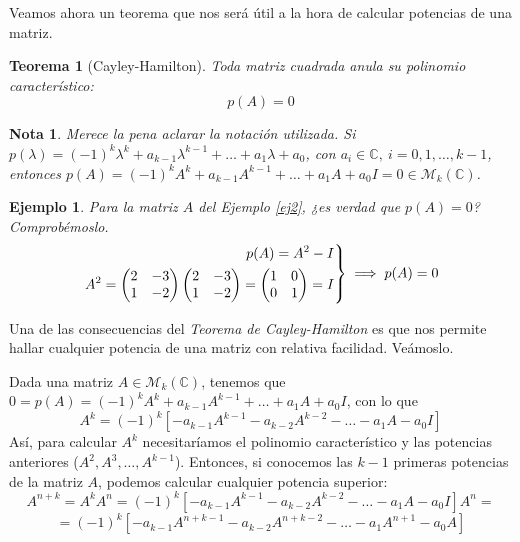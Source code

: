 \documentclass[11pt, a4paper]{article}
\newif\IfInSansMode
\numberwithin{equation}{section}
\newcommand{\pl}{p(\lambda)}
\theoremstyle{theorem-style}
\newtheorem{nth}{Teorema}[section]
\theoremstyle{definition-style}
\theoremstyle{remark-style}
\newtheorem*{nota}{Nota}
\theoremstyle{example-style}
\newtheorem{ejemplo}{Ejemplo}[section]
\newenvironment{rcases}
  {\left.\begin{aligned}}
  {\end{aligned}\right\rbrace}
\begin{document}
  Veamos ahora un teorema que nos será útil a la hora de calcular potencias de una matriz.

  \begin{nth}[Cayley-Hamilton]
    Toda matriz cuadrada anula su polinomio característico: $$p(A) = 0$$
  \end{nth}
  
  \begin{nota}
	Merece la pena aclarar la notación utilizada. Si $\pl = (-1)^k \lambda^k + a_{k-1}\lambda^{k-1} + \hdots + a_1\lambda + a_0$, con $a_i
  \in \mathbb C, \ i=0, 1, \hdots, k -1$, entonces $p(A) = (-1)^kA^k + a_{k-1}A^{k-1} + \hdots + a_1A + a_0I = 0 \in \mathcal M_k(\mathbb{C})$.
\end{nota}

  \begin{ejemplo} Para la matriz $A$ del \textit{Ejemplo}  \eqref{ej2}, ¿es verdad que $p(A) = 0$? Comprobémoslo.
  $$\begin{rcases}
   p(A) = A^2 - I \\
    A^2 =
    \begin{pmatrix}
      2 & -3 \\
      1 & -2
    \end{pmatrix}
    \begin{pmatrix}
      2  & -3 \\
      1 & -2
    \end{pmatrix} =
    \begin{pmatrix}
      1 & 0 \\
      0 & 1
    \end{pmatrix} = I
    \end{rcases} \implies p(A) = 0$$
  \end{ejemplo}

  Una de las consecuencias del \textit{Teorema de Cayley-Hamilton} es que nos permite hallar cualquier potencia de una matriz con relativa facilidad. Veámoslo.

  Dada una matriz $A \in \mathcal M_k(\mathbb C)$, tenemos que  $0 = p(A) = (-1)^kA^k + a_{k-1}A^{k-1} + \hdots + a_1A + a_0I$, con lo
que $$A^k = (-1)^k\left[-a_{k-1}A^{k-1}-a_{k-2}A^{k-2} - \hdots - a_1A -
  a_0I\right]$$
Así, para calcular $A^k$ necesitaríamos el polinomio característico y las
potencias anteriores ($A^2, A^3, \hdots, A^{k-1}$). 
Entonces, si conocemos las $k-1$ primeras potencias de la matriz $A$, podemos calcular cualquier potencia superior: $$A^{n+k} = A^kA^n = (-1)^k\left[-a_{k-1}A^{k-1}-a_{k-2}A^{k-2} - \hdots - a_1A - a_0I\right] A^n =$$ $$=(-1)^k\left[-a_{k-1}A^{n+k-1}-a_{k-2}A^{n+k-2} - \hdots - a_1A^{n+1} - a_0A\right]$$
\end{document}

